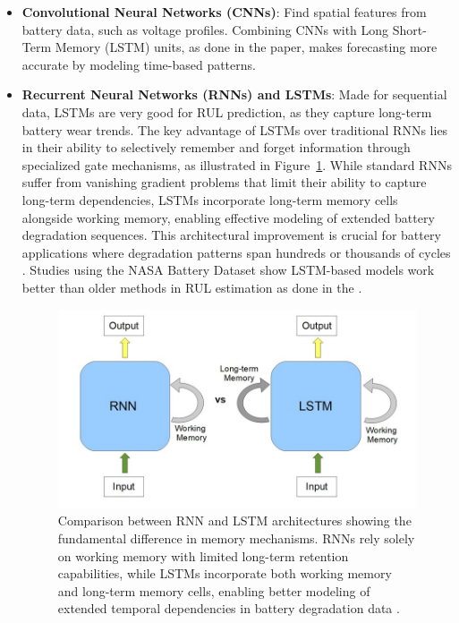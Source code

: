 \begin{itemize}
    \item \textbf{Convolutional Neural Networks (CNNs)}: Find spatial features from battery data, such as voltage profiles. Combining CNNs with Long Short-Term Memory (LSTM) units, as done in the \cite{Fangfang_Yang} paper, makes forecasting more accurate by modeling time-based patterns.
    \item \textbf{Recurrent Neural Networks (RNNs) and LSTMs}: Made for sequential data, LSTMs are very good for RUL prediction, as they capture long-term battery wear trends. The key advantage of LSTMs over traditional RNNs lies in their ability to selectively remember and forget information through specialized gate mechanisms, as illustrated in Figure~\ref{fig:rnn_vs_lstm_comparison}. While standard RNNs suffer from vanishing gradient problems that limit their ability to capture long-term dependencies, LSTMs incorporate long-term memory cells alongside working memory, enabling effective modeling of extended battery degradation sequences. This architectural improvement is crucial for battery applications where degradation patterns span hundreds or thousands of cycles \cite{noauthor_phenomnet_nodate}. Studies using the NASA Battery Dataset \cite{noauthor_nasa_nodate} show LSTM-based models work better than older methods in RUL estimation as done in the \cite{hong_state--health_2023}.

\begin{figure}[htbp]
\centering
\includegraphics[width=1\textwidth]{imgs/rnn_lstm.png}
\caption{Comparison between RNN and LSTM architectures showing the fundamental difference in memory mechanisms. RNNs rely solely on working memory with limited long-term retention capabilities, while LSTMs incorporate both working memory and long-term memory cells, enabling better modeling of extended temporal dependencies in battery degradation data \cite{noauthor_phenomnet_nodate}.}
\label{fig:rnn_vs_lstm_comparison}
\end{figure}


\end{itemize}
